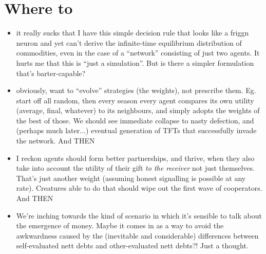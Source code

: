 \documentclass[11pt]{article}
\begin{document}
\section{Where to}

\begin{itemize}
\item it really sucks that I have this simple decision rule that looks like a friggn neuron and yet can't derive the infinite-time equilibrium distribution of commodities, even in the case of a ``network'' consisting of just two agents.
It hurts me that this is ``just a simulation''.
But is there a simpler formulation that's barter-capable?

\item obviously, want to ``evolve'' strategies (the weights), not prescribe them. Eg. start off all random, then every season every agent compares its own utility (average, final, whatever) to its neighbours, and simply adopts the weights of the best of those. We should see immediate collapse to nasty defection, and (perhaps much later...) eventual generation of TFTs that successfully invade the network. And THEN

\item I reckon agents should form better partnerships, and thrive, when they also take into account the utility of their gift {\it to the receiver} not just themselves. That's just another weight (assuming honest signalling is possible at any rate). Creatures able to do that should wipe out the first wave of cooperators. And THEN

\item We're inching towards the kind of scenario in which it's sensible to talk about the emergence of money. Maybe it comes in as a way to avoid the awkwardness caused by the (inevitable and considerable) differences between self-evaluated nett debts and other-evaluated nett debts?! Just a thought.
\end{itemize}
\end{document}
